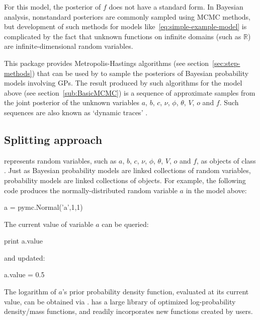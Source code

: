 \documentclass[article]{jss}
\begin{document}
For this model, the posterior of $f$ does not have a standard form. In Bayesian analysis, nonstandard posteriors are commonly sampled using MCMC methods, but development of such methods for models like~\ref{eq:simple-example-model} is complicated by the fact that unknown functions on infinite domains (such as $\mathbb R$) are infinite-dimensional random variables. 

This package provides Metropolis-Hastings algorithms (see section~\ref{sec:step-methods}) that can be used by  \citep{pymc} to sample the posteriors of Bayesian probability models involving GPs. The result produced by such algorithms for the model above (see section~\ref{sub:BasicMCMC}) is a sequence of approximate samples from the joint posterior of the unknown variables $a$, $b$, $c$, $\nu$, $\phi$, $\theta$, $V$, $o$ and $f$. Such sequences are also known as  `dynamic traces' \citep{gamerman}. 

\subsection{Splitting approach} 
 represents random variables, such as $a$, $b$, $c$, $\nu$, $\phi$, $\theta$, $V$, $o$ and $f$, as objects of class . Just as Bayesian probability models are linked collections of random variables,  probability models are linked collections of  objects. For example, the following code produces the normally-distributed random variable $a$ in the model above:
\begin{CodeChunk}
\begin{CodeInput}
a = pymc.Normal('a',1,1)
\end{CodeInput}
\end{CodeChunk}
The current value of variable $a$ can be queried:
\begin{CodeChunk}
\begin{CodeInput}
print a.value
\end{CodeInput}
\end{CodeChunk}
and updated:
\begin{CodeChunk}
\begin{CodeInput}
a.value = 0.5
\end{CodeInput}
\end{CodeChunk}
The logarithm of $a$'s prior probability density function, evaluated at its current value, can be obtained via .  has a large library of optimized log-probability density/mass functions, and readily incorporates new functions created by users.
\end{document}
